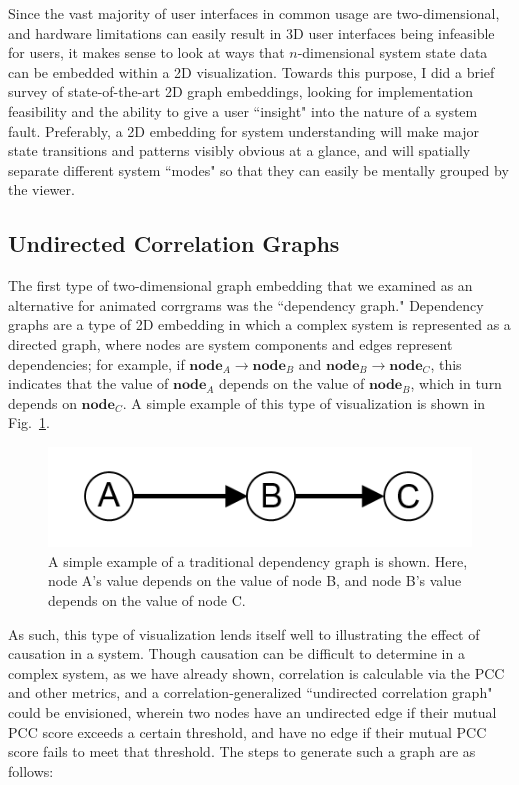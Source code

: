 Since the vast majority of user interfaces in common usage are two-dimensional, and hardware limitations can easily result in 3D user interfaces being infeasible for users, it makes sense to look at ways that $n$-dimensional system state data can be embedded within a 2D visualization. Towards this purpose, I did a brief survey of state-of-the-art 2D graph embeddings, looking for implementation feasibility and the ability to give a user ``insight" into the nature of a system fault. Preferably, a 2D embedding for system understanding will make major state transitions and patterns visibly obvious at a glance, and will spatially separate different system ``modes" so that they can easily be mentally grouped by the viewer.

\subsection{Undirected Correlation Graphs}

The first type of two-dimensional graph embedding that we examined as an alternative for animated corrgrams was the ``dependency graph." Dependency graphs are a type of 2D embedding in which a complex system is represented as a directed graph, where nodes are system components and edges represent dependencies; for example, if $\textbf{node}_{A} \rightarrow \textbf{node}_{B}$ and $\textbf{node}_{B} \rightarrow \textbf{node}_{C}$, this indicates that the value of $\textbf{node}_{A}$ depends on the value of $\textbf{node}_{B}$, which in turn depends on $\textbf{node}_{C}$. A simple example of this type of visualization is shown in Fig.~\ref{fig:dependency_graph_example}.

\begin{figure}[h]
\centering
    \includegraphics{images/dependency_graph_example.png}
    \caption{A simple example of a traditional dependency graph is shown. Here, node A's value depends on the value of node B, and node B's value depends on the value of node C.}
    \label{fig:dependency_graph_example}
\end{figure}

As such, this type of visualization lends itself well to illustrating the effect of causation in a system. Though causation can be difficult to determine in a complex system, as we have already shown, correlation is calculable via the PCC and other metrics, and a correlation-generalized ``undirected correlation graph" could be envisioned, wherein two nodes have an undirected edge if their mutual PCC score exceeds a certain threshold, and have no edge if their mutual PCC score fails to meet that threshold. The steps to generate such a graph are as follows:

